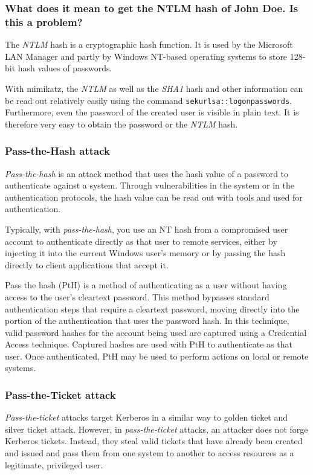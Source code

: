 \subsubsection{What does it mean to get the NTLM hash of John Doe. Is this a problem?}
The \textit{NTLM} hash is a cryptographic hash function. It is used by the Microsoft LAN Manager and partly by Windows NT-based operating systems to store 128-bit hash values of passwords.

With mimikatz, the \textit{NTLM} as well as the \textit{SHA1} hash and other information can be read out relatively easily using the command \lstinline|sekurlsa::logonpasswords|. Furthermore, even the password of the created user is visible in plain text.
It is therefore very easy to obtain the password or the \textit{NTLM} hash.

\subsubsection{Pass-the-Hash attack}
\textit{Pass-the-hash} is an attack method that uses the hash value of a password to authenticate against a system. Through vulnerabilities in the system or in the authentication protocols, the hash value can be read out with tools and used for authentication.

Typically, with \textit{pass-the-hash}, you use an NT hash from a compromised user account to authenticate directly as that user to remote services, either by injecting it into the current Windows user's memory or by passing the hash directly to client applications that accept it.

Pass the hash (PtH) is a method of authenticating as a user without having access to the user's cleartext password. This method bypasses standard authentication steps that require a cleartext password, moving directly into the portion of the authentication that uses the password hash. In this technique, valid password hashes for the account being used are captured using a Credential Access technique. Captured hashes are used with PtH to authenticate as that user. Once authenticated, PtH may be used to perform actions on local or remote systems.

\subsubsection{Pass-the-Ticket attack}
\textit{Pass-the-ticket} attacks target Kerberos in a similar way to golden ticket and silver ticket attack. However, in \textit{pass-the-ticket} attacks, an attacker does not forge Kerberos tickets. Instead, they steal valid tickets that have already been created and issued and pass them from one system to another to access resources as a legitimate, privileged user.

